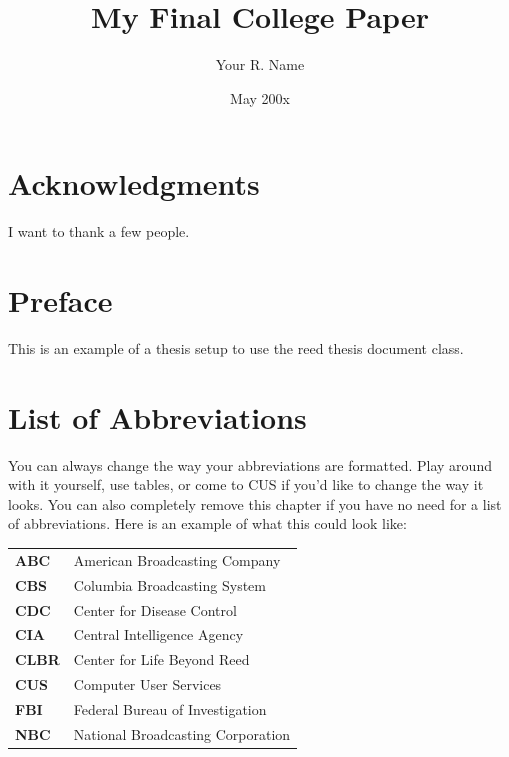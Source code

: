 \documentclass[12pt,twoside]{reedthesis}
\title{My Final College Paper}
\author{Your R. Name}
\date{May 200x}
\begin{document}
  \maketitle
  \frontmatter %
  \pagestyle{empty} %

    \chapter*{Acknowledgments}
	I want to thank a few people.

    \chapter*{Preface}
	This is an example of a thesis setup to use the reed thesis document class.



    \chapter*{List of Abbreviations}
		You can always change the way your abbreviations are formatted. Play around with it yourself, use tables, or come to CUS if you'd like to change the way it looks. You can also completely remove this chapter if you have no need for a list of abbreviations. Here is an example of what this could look like:

	\begin{table}[h]
	\centering %
	\begin{tabular}{ll}
		\textbf{ABC}  	&  American Broadcasting Company \\
		\textbf{CBS}  	&  Columbia Broadcasting System\\
		\textbf{CDC}  	&  Center for Disease Control \\
		\textbf{CIA}  	&  Central Intelligence Agency\\
		\textbf{CLBR} 	&  Center for Life Beyond Reed\\
		\textbf{CUS}  	&  Computer User Services\\
		\textbf{FBI}  	&  Federal Bureau of Investigation\\
		\textbf{NBC}  	&  National Broadcasting Corporation\\
	\end{tabular}
	\end{table}
\end{document}
